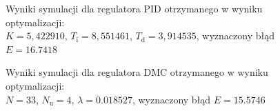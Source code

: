 \begin{figure}[ht]
\centering
{}
\caption{Wyniki symulacji dla regulatora PID otrzymanego w wyniku optymalizacji:\\ $K=5,422910$, $T_{\mathrm{i}}=8,551461$, $T_{\mathrm{d}}=3,914535$, wyznaczony błąd $E=\num{16,7418}$}
\label{Z6optimizedPID}
\end{figure}

\begin{figure}[ht]
\centering
{}
\caption{Wyniki symulacji dla regulatora DMC otrzymanego w wyniku optymalizacji:\\ $N=33$, $N_{\mathrm{u}}=4$, $\lambda=\num{0,018527}$, wyznaczony błąd $E=\num{15,5746}$}
\label{Z6optimizedDMC}
\end{figure}
